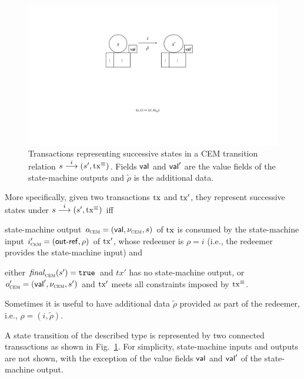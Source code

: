 \begin{figure}[t]
  \centering
  \includegraphics[scale=.2,width=\textwidth/2]{figures/state-transition_cropped.pdf}
  \caption{Transactions representing successive states in a CEM
    transition relation \({s}\overset{i}\longrightarrow(s', \mathrm{tx}^\equiv)\).  Fields
    $\mathsf{val}$ and $\mathsf{val}'$ are the value fields of the state-machine
    outputs and $\tilde \rho$ is the additional data.}
  \label{fig:state-transition}
\end{figure}

More specifically, given two transactions $\mathrm{tx}$ and $\mathrm{tx}'$, they represent successive states under \({s}\overset{i}\longrightarrow(s', \mathrm{tx}^\equiv)\) iff 

\begin{mitemize}
  \item state-machine output $o_{\textsc{cem}} = (\mathsf{val}, \nu_{\textsc{cem}}, s)$ of $\mathrm{tx}$
  is consumed by the state-machine input $i_{\textsc{cem}}' = (\mathsf{out\textsf{-}{}ref}, \rho)$
  of $\mathrm{tx}'$, whose redeemer is \(\rho = i\) (i.e., the redeemer
  provides the state-machine input) and
  \item either $\mathit{final}_{\textsc{cem}}(s') = \mathtt{true}$ and $tx'$ has no state-machine
  output, or $o_{\textsc{cem}}' = (\mathsf{val}', \nu_{\textsc{cem}}, s')$ and $\mathrm{tx}'$ meets all
  constraints imposed by $\mathrm{tx}^\equiv$.
\end{mitemize}
Sometimes it is useful to have additional data $\tilde \rho$ provided
as part of the redeemer, i.e., $\rho = (i,\tilde \rho)$.

A state transition of the described type is represented by two connected
transactions as shown in Fig.~\ref{fig:state-transition}.  For
simplicity, state-machine inputs and outputs are not shown, with the
exception of the value fields $\mathsf{val}$ and $\mathsf{val}'$ of the state-machine output.



